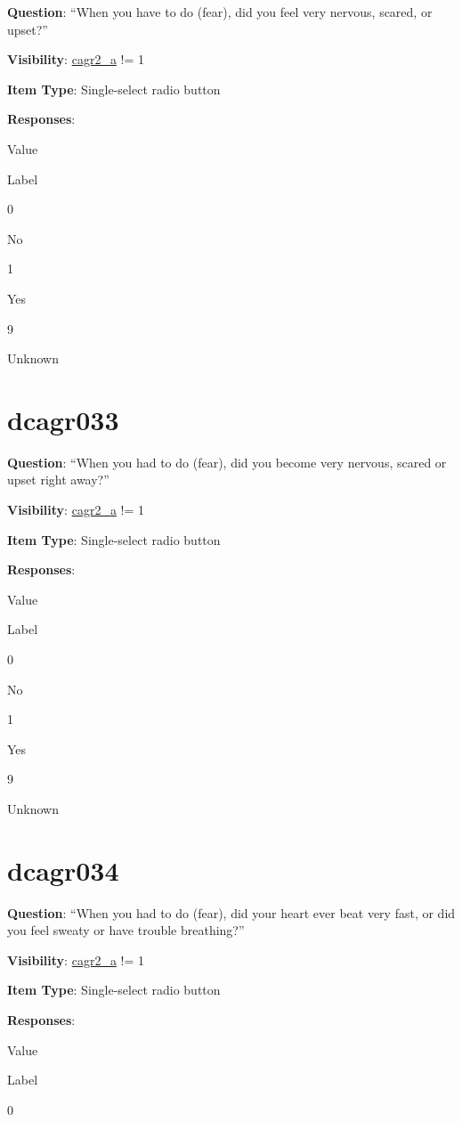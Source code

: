 \documentclass[]{book}
\begin{document}
\textbf{Question}: ``When you have to do (fear), did you feel very nervous, scared, or upset?''

\textbf{Visibility}: \protect\hyperlink{cagr2_a}{cagr2\_a} != 1

\textbf{Item Type}: Single-select radio button

\textbf{Responses}:

Value

Label

0

No

1

Yes

9

Unknown

\hypertarget{dcagr033}{%
\section{dcagr033}\label{dcagr033}}

\textbf{Question}: ``When you had to do (fear), did you become very nervous, scared or upset right away?''

\textbf{Visibility}: \protect\hyperlink{cagr2_a}{cagr2\_a} != 1

\textbf{Item Type}: Single-select radio button

\textbf{Responses}:

Value

Label

0

No

1

Yes

9

Unknown

\hypertarget{dcagr034}{%
\section{dcagr034}\label{dcagr034}}

\textbf{Question}: ``When you had to do (fear), did your heart ever beat very fast, or did you feel sweaty or have trouble breathing?''

\textbf{Visibility}: \protect\hyperlink{cagr2_a}{cagr2\_a} != 1

\textbf{Item Type}: Single-select radio button

\textbf{Responses}:

Value

Label

0
\end{document}
